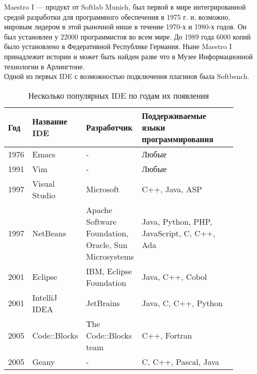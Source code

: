 Maestro I — продукт от Softlab Munich, был первой в мире интегрированной средой разработки для программного обеспечения в 1975 г. и, возможно, мировым лидером в этой рыночной нише в течение 1970-х и 1980-х годов. Он был установлен у 22000 программистов во всем мире. До 1989 года 6000 копий было установлено в Федеративной Республике Германия. Ныне Maestro I принадлежит истории и может быть найден разве что в Музее Информационной технологии в Арлингтоне.\\

Одной из первых IDE с возможностью подключения плагинов была Softbench.\\
\begin{table}[h]
    \caption{Несколько популярных IDE по годам их появления}
    \centering
    \begin{tabular}[h!]{| p{0.055\linewidth} | p{0.2\linewidth} | p{0.2\linewidth} | p{0.45\linewidth} |}
        \hline
        Год & Название IDE & Разработчик & Поддерживаемые языки программирования \\ \hline
        1976 & Emacs & - & Любые \\\hline
        1991 & Vim & - & Любые\\\hline
        1997 & Visual Studio & Microsoft & C++, Java, ASP \\\hline
        1997 & NetBeans & Apache Software Foundation, Oracle, Sun Microsystems & Java, Python, PHP, JavaScript, C, C++, Ada\\ \hline
        2001 & Eclipse & IBM, Eclipse Foundation & Java, C++, Cobol\\\hline
        2001 & IntelliJ IDEA & JetBrains & Java, C, C++, Python\\\hline
        2005 & Code::Blocks & The Code::Blocks team & C++, Fortran\\\hline
        2005 & Geany & - &C, C++, Pascal, Java \\\hline
    \end{tabular}
\end{table}
